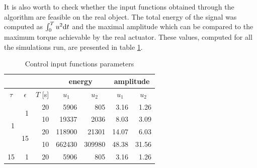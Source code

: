 It is also worth to check whether the input functions obtained through the algorithm
are feasible on the real object. The total energy of the signal was computed as $\int_0^T u^2\mathrm{d} t$
and the maximal amplitude which can be compared to the maximum torque achievable by the real actuator.
These values, computed for all the simulations run, are presented in table \ref{tab:control}.
\begin{table}[h]
\centering
\caption{Control input functions parameters}
\label{tab:control}
\begin{tabular}{rrr|r|r|r|r|}
\cline{4-7}
\multicolumn{1}{c}{}                      & \multicolumn{1}{c}{}                     & \multicolumn{1}{c|}{}            & \multicolumn{2}{c|}{energy}                             & \multicolumn{2}{c|}{amplitude}                          \\ \hline
\multicolumn{1}{|c|}{$\tau$}              & \multicolumn{1}{c|}{$\epsilon$}          & \multicolumn{1}{c|}{$T$ {[}s{]}} & \multicolumn{1}{c|}{$u_1$} & \multicolumn{1}{c|}{$u_2$} & \multicolumn{1}{c|}{$u_1$} & \multicolumn{1}{c|}{$u_2$} \\ \hline
\multicolumn{1}{|r|}{\multirow{4}{*}{1}}  & \multicolumn{1}{r|}{\multirow{2}{*}{1}}  & 20                               & 5906                       & 805                        & 3.16                       & 1.26                       \\ \cline{3-7} 
\multicolumn{1}{|r|}{}                    & \multicolumn{1}{r|}{}                    & 10                               & 19337                      & 2036                       & 8.03                       & 3.09                       \\ \cline{2-7} 
\multicolumn{1}{|r|}{}                    & \multicolumn{1}{r|}{\multirow{2}{*}{15}} & 20                               & 118900                     & 21301                      & 14.07                      & 6.03                       \\ \cline{3-7} 
\multicolumn{1}{|r|}{}                    & \multicolumn{1}{r|}{}                    & 10                               & 662430                     & 309980                     & 48.38                      & 31.56                      \\ \hline
\multicolumn{1}{|r|}{\multirow{4}{*}{15}} & \multicolumn{1}{r|}{\multirow{2}{*}{1}}  & 20                               & 5906                       & 805                        & 3.16                       & 1.26                       \\ \cline{3-7} 

\end{tabular}
\end{table}
